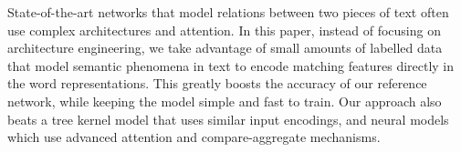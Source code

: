 State-of-the-art networks that model relations between two pieces of text often use complex architectures and attention. In this paper, instead of focusing on architecture engineering, we take advantage of small amounts of labelled data that model semantic phenomena in text to encode matching features directly in the word representations. This greatly boosts the accuracy of our reference network, while keeping the model simple and fast to train. Our approach also beats a tree kernel model that uses similar input encodings, and neural models which use advanced attention and compare-aggregate mechanisms.
